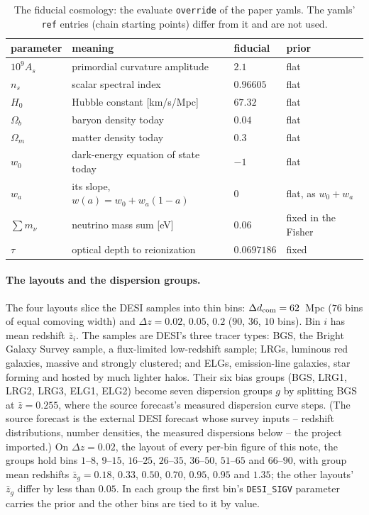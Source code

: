 \documentclass[11pt]{article}
\newcommand{\dcom}{$\Delta d_{\rm com} = 62$~Mpc}
\newcommand{\us}{\_\allowbreak}
\begin{document}
\begin{table}[tbp]
  \centering
  \begin{tabular}{llll}
    \hline
    parameter & meaning & fiducial & prior \\
    \hline
    $10^9 A_s$ & primordial curvature amplitude & $2.1$ & flat \\
    $n_s$ & scalar spectral index & $0.96605$ & flat \\
    $H_0$ & Hubble constant [km/s/Mpc] & $67.32$ & flat \\
    $\Omega_b$ & baryon density today & $0.04$ & flat \\
    $\Omega_m$ & matter density today & $0.3$ & flat \\
    $w_0$ & dark-energy equation of state today & $-1$ & flat \\
    $w_a$ & its slope, $w(a) = w_0 + w_a(1 - a)$ & $0$ & flat, as $w_0 + w_a$ \\
    $\sum m_\nu$ & neutrino mass sum [eV] & $0.06$ & fixed in the Fisher \\
    $\tau$ & optical depth to reionization & $0.0697186$ & fixed \\
    \hline
  \end{tabular}
  \caption{The fiducial cosmology: the evaluate \texttt{override} of
    the paper yamls.  The yamls' \texttt{ref} entries (chain starting
    points) differ from it and are not used.}
  \label{tab:fidcosmo}
\end{table}

\paragraph{The layouts and the dispersion groups.}
The four layouts slice the DESI samples into thin bins: \dcom{} ($76$
bins of equal comoving width) and $\Delta z = 0.02$, $0.05$, $0.2$
($90$, $36$, $10$ bins).  Bin $i$ has mean redshift $\bar{z}_i$.  The
samples are DESI's three tracer types: BGS, the Bright Galaxy Survey
sample, a flux-limited low-redshift sample; LRGs, luminous red
galaxies, massive and strongly clustered; and ELGs, emission-line
galaxies, star forming and hosted by much lighter halos.  Their
six bias groups (BGS, LRG1, LRG2, LRG3, ELG1, ELG2) become seven
dispersion groups $g$ by splitting BGS at $\bar{z} = 0.255$, where the
source forecast's measured dispersion curve steps.  (The source
forecast is the external DESI forecast whose survey inputs -- redshift
distributions, number densities, the measured dispersions below -- the
project imported.)  On
$\Delta z = 0.02$, the layout of every per-bin figure of this note, the
groups hold bins $1$--$8$, $9$--$15$, $16$--$25$, $26$--$35$,
$36$--$50$, $51$--$65$ and $66$--$90$, with group mean redshifts
$\bar{z}_g = 0.18$, $0.33$, $0.50$, $0.70$, $0.95$, $0.95$ and $1.35$;
the other layouts' $\bar{z}_g$ differ by less than $0.05$.  In each
group the first bin's \texttt{DESI\us SIGV} parameter carries the prior
and the other bins are tied to it by value.
\end{document}
